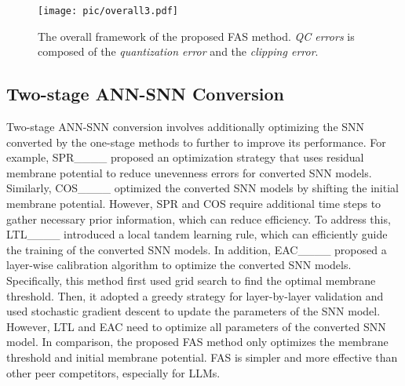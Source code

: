 \begin{figure}[!t]
\vskip 0.1in
    \centering
    \texttt{[image: pic/overall3.pdf]}
    \caption{The overall framework of the proposed FAS method. \textit{QC errors} is composed of the \textit{quantization error} and the \textit{clipping error}.}
    \vskip -0.1in
    \label{fig3}
\end{figure}

\subsection{Two-stage ANN-SNN Conversion}
Two-stage ANN-SNN conversion involves additionally optimizing the SNN converted by the one-stage methods to further to improve its performance. For example, SPR____ proposed an optimization strategy that uses residual membrane potential to reduce unevenness errors for converted SNN models. Similarly, COS____ optimized the converted SNN models by shifting the initial membrane potential. However, SPR and COS require additional time steps to gather necessary prior information, which can reduce efficiency. To address this, LTL____ introduced a local tandem learning rule, which can efficiently guide the training of the converted SNN models. In addition, EAC____ proposed a layer-wise calibration algorithm to optimize the converted SNN models. Specifically, this method first used grid search to find the optimal membrane threshold. Then, it adopted a greedy strategy for layer-by-layer validation and used stochastic gradient descent to update the parameters of the SNN model. However, LTL and EAC need to optimize all parameters of the converted SNN model. In comparison, the proposed FAS method only optimizes the membrane threshold and initial membrane potential. FAS is simpler and more effective than other peer competitors, especially for LLMs.


